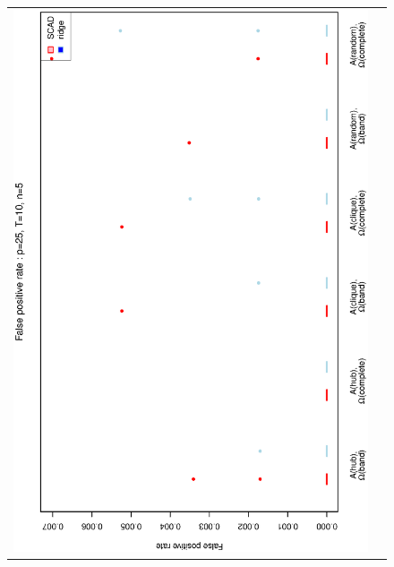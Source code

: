 \documentclass[a4paper]{article}
\begin{document}
\begin{figure}[h!]
\centering
\begin{tabular}{cc}
\includegraphics[scale=0.45,angle=270]{ROCfpr25T10N5_5.eps}
\\

\end{tabular}
\end{figure}
\end{document}
